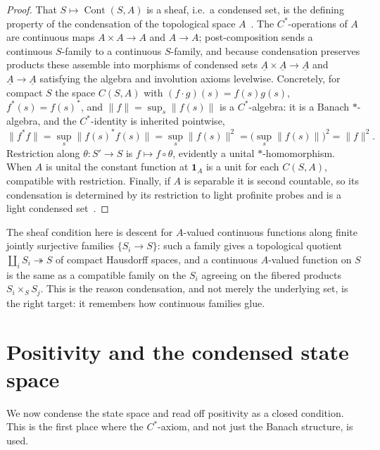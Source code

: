 \documentclass[12pt]{article}
\newcommand{\cond}[1]{\underline{#1}}          %
\newcommand{\Cont}{\operatorname{Cont}}        %
\newcommand{\norm}[1]{\lVert #1 \rVert}
\newcommand{\id}{\mathbf{1}}
\theoremstyle{plain}
\begin{document}
\begin{proof}
That $S\mapsto\Cont(S,A)$ is a sheaf, i.e.\ a condensed set, is the defining
property of the condensation of the topological space
$A$~\cite{clausen-scholze-condensed}. The $C^{*}$-operations of $A$ are continuous
maps $A\times A\to A$ and $A\to A$; post-composition sends a continuous $S$-family
to a continuous $S$-family, and because condensation preserves products these
assemble into morphisms of condensed sets
$\cond{A}\times\cond{A}\to\cond{A}$ and $\cond{A}\to\cond{A}$ satisfying the algebra
and involution axioms levelwise. Concretely, for compact $S$ the space $C(S,A)$ with
$(f\cdot g)(s)=f(s)g(s)$, $f^{*}(s)=f(s)^{*}$, and $\norm{f}=\sup_{s}\norm{f(s)}$ is
a $C^{*}$-algebra: it is a Banach $\ast$-algebra, and the $C^{*}$-identity is
inherited pointwise,
\[
  \norm{f^{*}f} = \sup_{s}\norm{f(s)^{*}f(s)}
               = \sup_{s}\norm{f(s)}^{2}
               = \Big(\sup_{s}\norm{f(s)}\Big)^{2} = \norm{f}^{2}.
\]
Restriction along $\theta:S'\to S$ is $f\mapsto f\circ\theta$, evidently a unital
$\ast$-homomorphism. When $A$ is unital the constant function at $\id_{A}$ is a unit
for each $C(S,A)$, compatible with restriction. Finally, if $A$ is separable it is
second countable, so its condensation is determined by its restriction to light
profinite probes and is a light condensed
set~\cite{clausen-scholze-analytic-stacks}.
\end{proof}

\begin{remark}
The sheaf condition here is descent for $A$-valued continuous functions along finite
jointly surjective families $\{S_{i}\to S\}$: such a family gives a topological
quotient $\coprod_{i}S_{i}\twoheadrightarrow S$ of compact Hausdorff spaces, and a
continuous $A$-valued function on $S$ is the same as a compatible family on the
$S_{i}$ agreeing on the fibered products $S_{i}\times_{S}S_{j}$. This is the reason
condensation, and not merely the underlying set, is the right target: it remembers
how continuous families glue.
\end{remark}

\section{Positivity and the condensed state space}
\label{sec:states}

We now condense the state space and read off positivity as a closed condition. This
is the first place where the $C^{*}$-axiom, and not just the Banach structure, is
used.
\end{document}
